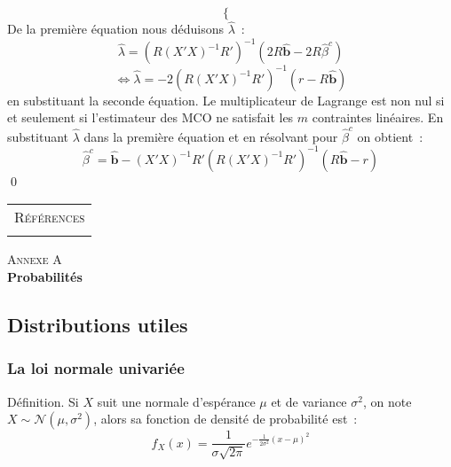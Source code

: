 \documentclass[10pt]{beamer}
\theoremstyle{plain}
\newenvironment{defn}[1]
{\bgroup \small\begin{block}{Définition. #1}}
  {\end{block}\egroup}
\begin{document}
\begin{notes}
\[\begin{cases}
    \end{cases}
  \]
  De la première équation nous déduisons $\hat{\lambda}$~:
  \[
    \hat\lambda = \left( R(X'X)^{-1}R' \right)^{-1}\left( 2R\hat{\mathbf b} - 2R\hat{\beta}^c \right)
  \]
  \[
    \Leftrightarrow \hat{\lambda} = -2 \left( R(X'X)^{-1}R' \right)^{-1}\left( r - R\hat{\mathbf b}\right)
  \]
  en substituant la seconde équation. Le multiplicateur de Lagrange est non nul si et seulement si l'estimateur des MCO ne satisfait les $m$ contraintes linéaires. En substituant $\hat\lambda$ dans la première équation et en résolvant pour $\hat{\beta}^c$ on obtient~:
\[
      \hat{\beta}^c = \hat{\mathbf b} - (X'X)^{-1}R'\left( R(X'X)^{-1}R' \right)^{-1}\left( R\hat{\mathbf b}-r \right)
    \]
    \qed

\end{notes}

\begin{notes}

  \begin{center}
    \begin{tabular}{c}
      \\
      \Huge{\textsc{Références}}\\
      \\
    \end{tabular}
  \end{center}

  \bigskip

  \nocite{Green2017}

  \nocite{Schmidt1976}

  \printbibliography

\end{notes}



\begin{frame}
  \begin{center}
    \Huge{\textsc{Annexe A}}\\
    \Huge\textbf{Probabilités}
  \end{center}
\end{frame}

\subsection{Distributions utiles}

\begin{frame}
  \frametitle{La loi normale univariée}

  \begin{defn}{}
    Si $X$ suit une normale d'espérance $\mu$ et de variance $\sigma^2$, on note $X\sim\mathcal N \left(\mu, \sigma^2\right)$, alors sa fonction de densité de probabilité est~:
    \[
      f_X(x) = \frac{1}{\sigma\sqrt{2\pi}}e^{-\frac{1}{2\sigma^2}\left(x-\mu\right)^2}
    \]
  \end{defn}

\end{frame}
\end{document}
